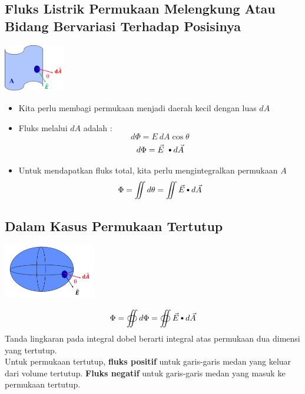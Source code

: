 \documentclass[twocolumn, 11pt]{article}%
\newcommand\sbullet[1][.5]{\mathbin{\ThisStyle{\vcenter{\hbox{%
  \scalebox{#1}{$\SavedStyle\bullet$}}}}}%
}
\begin{document}
    \subsection{Fluks Listrik Permukaan Melengkung Atau Bidang Bervariasi Terhadap Posisinya}%
    
    \begin{center}
        \includegraphics[width=100px]{5.png}
    \end{center}

    \begin{itemize}
        \item Kita perlu membagi permukaan menjadi daerah kecil dengan luas $dA$
        \item Fluks melalui $dA$ adalah :
            \[ d \Phi= E\ dA \cos \theta \]
            \[ d \Phi= \vec E\ \sbullet[.75] d \vec A \]
        \item Untuk mendapatkan fluks total, kita perlu mengintegralkan permukaan $A$
            \[ \Phi = \iint d\theta = \iint \vec E \sbullet[.75] d \vec A\]
    \end{itemize}

    \subsection{Dalam Kasus Permukaan Tertutup}%

    \begin{center}
        \includegraphics[width=150px]{6.png}
    \end{center}
    
    \[ \Phi = \oiint d \Phi = \oiint \vec E \sbullet[.75] d \vec A \]
    Tanda lingkaran pada integral dobel berarti integral atas permukaan dua dimensi yang tertutup.\\

    Untuk permukaan tertutup, \textbf{fluks positif} untuk garis-garis medan yang keluar dari volume tertutup. \textbf{Fluks negatif} untuk garis-garis medan yang masuk ke permukaan tertutup.
\end{document}
